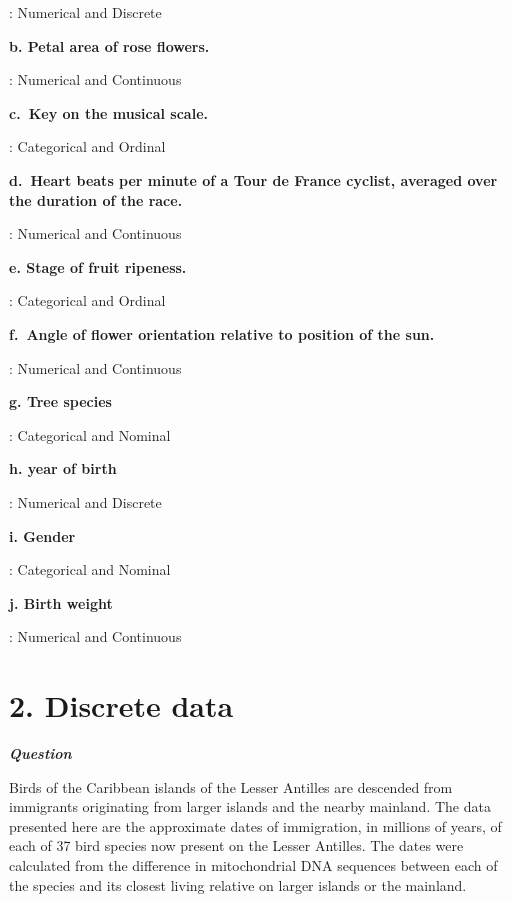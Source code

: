 \documentclass[
  a4paper,
  DIV=11,
  numbers=noendperiod]{scrreprt}
\begin{document}
: Numerical and Discrete

\textbf{b. Petal area of rose flowers.}

: Numerical and Continuous

\textbf{c.~Key on the musical scale.}

: Categorical and Ordinal

\textbf{d.~Heart beats per minute of a Tour de France cyclist, averaged
over the duration of the race.}

: Numerical and Continuous

\textbf{e. Stage of fruit ripeness.}

: Categorical and Ordinal

\textbf{f.~Angle of flower orientation relative to position of the sun.}

: Numerical and Continuous

\textbf{g. Tree species}

: Categorical and Nominal

\textbf{h. year of birth}

: Numerical and Discrete

\textbf{i. Gender}

: Categorical and Nominal

\textbf{j. Birth weight}

: Numerical and Continuous

\section*{2. Discrete data}\label{discrete-data}


\textbf{\emph{Question}}

Birds of the Caribbean islands of the Lesser Antilles are descended from
immigrants originating from larger islands and the nearby mainland. The
data presented here are the approximate dates of immigration, in
millions of years, of each of 37 bird species now present on the Lesser
Antilles. The dates were calculated from the difference in mitochondrial
DNA sequences between each of the species and its closest living
relative on larger islands or the mainland.
\end{document}

